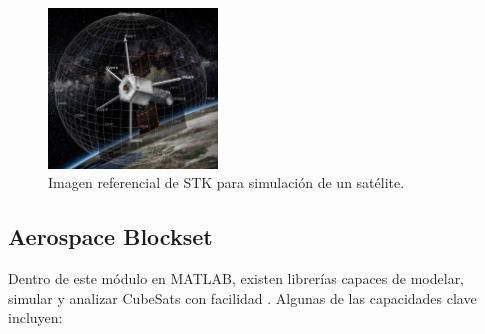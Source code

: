 \begin{figure}[H]
	\centering    
	\includegraphics[width=0.4\textwidth]{STK.png}
	\caption{Imagen referencial de STK para simulación de un satélite.}
	\label{fig:STK}
\end{figure}
\subsection{Aerospace Blockset}

Dentro de este módulo en MATLAB, existen librerías capaces de modelar, simular y analizar CubeSats con facilidad \cite{ref19}. Algunas de las capacidades clave incluyen:

